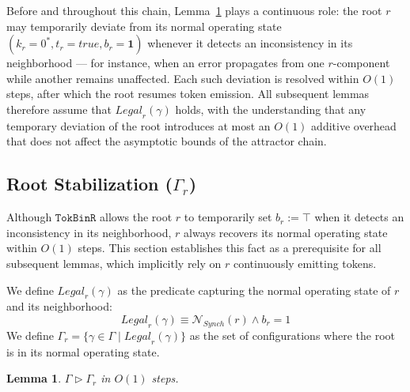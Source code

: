 \documentclass[a4paper, 12pt]{article}
\newtheorem{lemma}[theorem]{Lemma}
\newcommand{\bo}{\mathbf{1}}
\newcommand{\rk}{k}
\begin{document}
\medskip

Before and throughout this chain, Lemma~\ref{lem:root} plays a 
continuous role: the root $r$ may temporarily deviate from its normal 
operating state $(\rk_r = 0^*, t_r = \mathit{true}, b_r = \bo)$ 
whenever it detects an inconsistency in its neighborhood — for 
instance, when an error propagates from one $r$-component while 
another remains unaffected. Each such deviation is resolved within 
$O(1)$ steps, after which the root resumes token emission. All 
subsequent lemmas therefore assume that $\mathit{Legal}_r(\gamma)$ 
holds, with the understanding that any temporary deviation of the root 
introduces at most an $O(1)$ additive overhead that does not affect 
the asymptotic bounds of the attractor chain. 
\subsection{Root Stabilization ($\Gamma_r$)}
\label{sec:root}

Although $\mathtt{TokBinR}$ allows the root $r$ to temporarily set 
$b_r := \top$ when it detects an inconsistency in its neighborhood, 
$r$ always recovers its normal operating state within $O(1)$ steps. 
This section establishes this fact as a prerequisite for all subsequent 
lemmas, which implicitly rely on $r$ continuously emitting tokens.

We define $\mathit{Legal}_r(\gamma)$ as the predicate capturing the 
normal operating state of $r$ and its neighborhood:
\begin{equation}
    \mathit{Legal}_r(\gamma) \equiv \mathcal{N}_{Synch}(r) \wedge b_r = 1
    \label{eq:legalr_root}
\end{equation}
We define $\Gamma_r = \{\gamma \in \Gamma \mid \mathit{Legal}_r(\gamma)\}$ 
as the set of configurations where the root is in its normal operating 
state.

\begin{lemma}
\label{lem:root}
$\Gamma \triangleright \Gamma_r$ in $O(1)$ steps.
\end{lemma}
\end{document}
